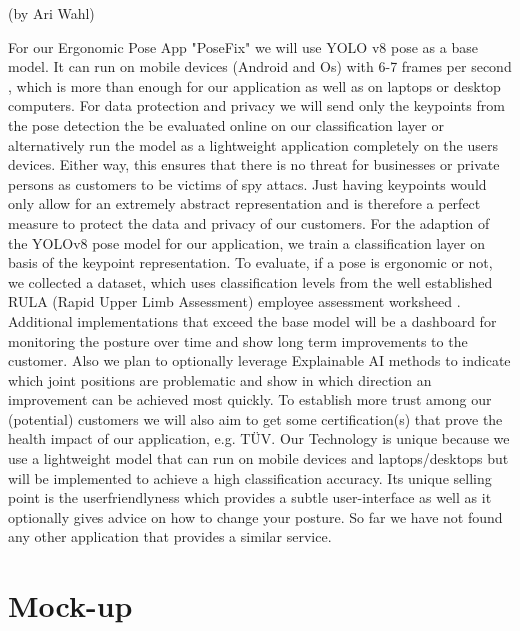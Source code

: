 (by Ari Wahl)

For our Ergonomic Pose App "PoseFix" we will use YOLO v8 pose as a base model. 
It can run on mobile devices (Android and Os) with 6-7 frames per second \cite{ultralytics2022}, 
which is more than enough for our application as well as on laptops or desktop computers. For data protection and privacy we will send only the keypoints from the pose detection 
the be evaluated online on our classification layer or alternatively run the model as a lightweight application completely on the users devices. 
Either way, this ensures that there is no threat for businesses or private persons as customers to be victims of spy attacs. Just having keypoints 
would only allow for an extremely abstract representation and is therefore a perfect measure to protect the data and privacy of our customers. 
For the adaption of the YOLOv8 pose model for our application, we train a classification layer on basis of the keypoint representation. 
To evaluate, if a pose is ergonomic or not, we collected a dataset, which uses classification levels from the well established RULA (Rapid Upper Limb Assessment) employee assessment 
worksheed \cite{Holzgreve_2022}. 
Additional implementations that exceed the base model will be a dashboard for monitoring the posture over time and show long term improvements 
to the customer. Also we plan to optionally leverage Explainable AI methods to indicate which joint positions are problematic and show
 in which direction an improvement can be achieved most quickly. To establish more trust among our (potential) customers 
 we will also aim to get some certification(s) that prove the health impact of our application, e.g. TÜV. 
Our Technology is unique because we use a lightweight model that can run on mobile devices and laptops/desktops but will be implemented to achieve a high classification accuracy.
Its unique selling point is the userfriendlyness which provides a subtle user-interface as well as it optionally gives advice on how to change your posture.
So far we have not found any other application that provides a similar service.

\section{Mock-up}

